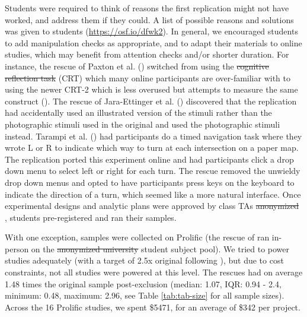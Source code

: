 \documentclass[
  english,
  a4paper,
]{article}
\providecommand{\DIFaddtex}[1]{{\protect\color{blue}\uwave{#1}}} %
\providecommand{\DIFdeltex}[1]{{\protect\color{red}\sout{#1}}}                      %
\providecommand{\DIFaddbegin}{} %
\providecommand{\DIFaddend}{} %
\providecommand{\DIFdelbegin}{} %
\providecommand{\DIFdelend}{} %
\providecommand{\DIFadd}[1]{\texorpdfstring{\DIFaddtex{#1}}{#1}} %
\providecommand{\DIFdel}[1]{\texorpdfstring{\DIFdeltex{#1}}{}} %
\newcommand{\DIFscaledelfig}{0.5}
\newlength{\DIFdelgraphicswidth} %
\newlength{\DIFdelgraphicsheight} %
\newcommand{\DIFaddincludegraphics}[2][]{{\color{blue}\fbox{\DIFOincludegraphics[#1]{#2}}}} %
\newcommand{\DIFdelincludegraphics}[2][]{%
\sbox{\DIFdelgraphicsbox}{\DIFOincludegraphics[#1]{#2}}%
\settoboxwidth{\DIFdelgraphicswidth}{\DIFdelgraphicsbox} %
\settoboxtotalheight{\DIFdelgraphicsheight}{\DIFdelgraphicsbox} %
\scalebox{\DIFscaledelfig}{%
\parbox[b]{\DIFdelgraphicswidth}{\usebox{\DIFdelgraphicsbox}\\[-\baselineskip] \rule{\DIFdelgraphicswidth}{0em}}\llap{\resizebox{\DIFdelgraphicswidth}{\DIFdelgraphicsheight}{%
\setlength{\unitlength}{\DIFdelgraphicswidth}%
\begin{picture}(1,1)%
\thicklines\linethickness{2pt} %
{\color[rgb]{1,0,0}\put(0,0){\framebox(1,1){}}}%
{\color[rgb]{1,0,0}\put(0,0){\line( 1,1){1}}}%
{\color[rgb]{1,0,0}\put(0,1){\line(1,-1){1}}}%
\end{picture}%
}\hspace*{3pt}}} %
} %
\DeclareRobustCommand{\DIFaddbegin}{\DIFOaddbegin \let\includegraphics\DIFaddincludegraphics} %
\DeclareRobustCommand{\DIFaddend}{\DIFOaddend \let\includegraphics\DIFOincludegraphics} %
\DeclareRobustCommand{\DIFdelbegin}{\DIFOdelbegin \let\includegraphics\DIFdelincludegraphics} %
\DeclareRobustCommand{\DIFdelend}{\DIFOaddend \let\includegraphics\DIFOincludegraphics} %
\begin{document}
Students were required to think of reasons the first replication might not have worked, and address them if they could.
A list of possible reasons and solutions was given to students (\url{https://osf.io/dfwk2}).
In general, we encouraged students to add manipulation checks as appropriate, and to adapt their materials to online studies, which may benefit from attention checks and/or shorter duration.
For instance, the rescue of Paxton et al. () switched from using the \DIFdelbegin \DIFdel{cognitive reflection task }\DIFdelend \DIFaddbegin \DIFadd{Cognitive Teflection Test }\DIFaddend (CRT) which many online participants are over-familiar with to using the newer CRT-2 which is less overused but attempts to measure the same construct ().
The rescue of Jara-Ettinger et al. () discovered that the replication had accidentally used an illustrated version of the stimuli rather than the photographic stimuli used in the original and used the photographic stimuli instead.
Tarampi et al. () had participants do a timed navigation task where they wrote L or R to indicate which way to turn at each intersection on a paper map.
The replication ported this experiment online and had participants click a drop down menu to select left or right for each turn.
The rescue removed the unwieldy drop down menus and opted to have participants press keys on the keyboard to indicate the direction of a turn, which seemed like a more natural interface.
Once experimental designs and analytic plans were approved by class TAs \DIFdelbegin %
\DIFdel{anonymized}%
\DIFdelend \DIFaddbegin \DIFadd{(VB and BP)}\DIFaddend , students pre-registered and ran their samples.

With one exception, samples were collected on Prolific (the rescue of  ran in-person on the \DIFdelbegin %
\DIFdel{anonymized university}%
\DIFdelend \DIFaddbegin \DIFadd{Stanford }\DIFaddend student subject pool).
We tried to power studies adequately (with a target of 2.5x original following ), but due to cost constraints, not all studies were powered at this level.
The rescues had on average 1.48 times the original sample post-exclusion (median: 1.07, IQR: 0.94 - 2.4, minimum: 0.48, maximum: 2.96, see Table \ref{tab:tab-size} for all sample sizes).
Across the 16 Prolific studies, we spent \$5471, for an average of \$342 per project.
\end{document}
